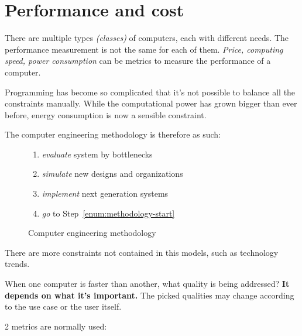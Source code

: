 \documentclass[english]{article}
\begin{document}
\newpage

\section{Performance and cost}

There are multiple types \textit{(classes)} of computers, each with different needs.
The performance measurement is not the same for each of them.
\textit{Price, computing speed, power consumption} can be metrics to measure the performance of a computer.

Programming has become so complicated that it's not possible to balance all the constraints manually.
While the computational power has grown bigger than ever before, energy consumption is now a sensible constraint.

The computer engineering methodology is therefore as such:

\begin{figure}[htbp]
  \bigskip
  \centering
  \begin{minipage}[h]{0.45\textwidth}
    \centering
  \end{minipage}
  \begin{minipage}[h]{0.45\textwidth}
    \begin{enumerate}
      \item \label{enum:methodology-start} \textit{evaluate} system by bottlenecks
      \item \textit{simulate} new designs and organizations
      \item \textit{implement} next generation systems
      \item \textit{go} to Step~\ref{enum:methodology-start}
    \end{enumerate}
  \end{minipage}
  \caption{Computer engineering methodology}
  \label{fig:computer-engineering-methodology}
  \bigskip
\end{figure}

There are more constraints not contained in this models, such as technology trends.

\bigskip
When one computer is faster than another, what quality is being addressed?
\textbf{It depends on what it's important.}
The picked qualities may change according to the use case or the user itself.

2 metrics are normally used:
\end{document}
